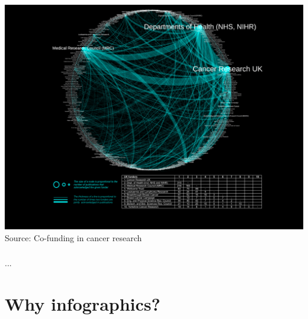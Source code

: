 \documentclass[8pt]{beamer}
\begin{document}

\begin{frame}
\frametitle{\insertsection}
\centering
\includegraphics[width=\linewidth,height=0.8\textheight,keepaspectratio]{cruk}\\
\tiny Source: Co-funding in cancer research \cite{Grassano2017}
\end{frame}


\begin{frame}
\frametitle{\insertsection}
\centering
\Huge ...
\end{frame}





\section{Why infographics?}


\bgroup
{}
\begin{frame}[plain]{}
\begin{center}
\color{white}{\Huge \insertsection}
\end{center}
\end{frame}
\egroup
\end{document}
